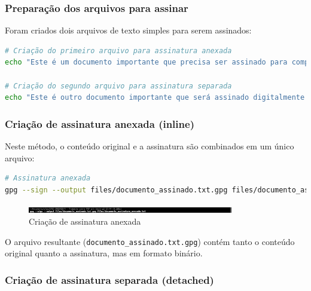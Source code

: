 \subsubsection{Preparação dos arquivos para assinar}

Foram criados dois arquivos de texto simples para serem assinados:

\begin{lstlisting}[language=bash]
# Criação do primeiro arquivo para assinatura anexada
echo "Este é um documento importante que precisa ser assinado para comprovar sua autenticidade. Esta assinatura será anexada ao conteúdo original." > files/documento_assinatura_anexada.txt

# Criação do segundo arquivo para assinatura separada
echo "Este é outro documento importante que será assinado digitalmente. Esta assinatura será mantida em um arquivo separado." > files/documento_assinatura_separada.txt
\end{lstlisting}

\subsubsection{Criação de assinatura anexada (inline)}

Neste método, o conteúdo original e a assinatura são combinados em um único arquivo:

\begin{lstlisting}[language=bash]
# Assinatura anexada
gpg --sign --output files/documento_assinado.txt.gpg files/documento_assinatura_anexada.txt
\end{lstlisting}

\begin{figure}[htb]
    \centering
    \includegraphics[width=0.8\textwidth]{images/11-criacao_assinatura_anexada.jpg}
    \caption{Criação de assinatura anexada}
    \label{fig:criacao-assinatura-anexada}
\end{figure}

O arquivo resultante (\texttt{documento\_assinado.txt.gpg}) contém tanto o conteúdo original quanto a assinatura, mas em formato binário.

\subsubsection{Criação de assinatura separada (detached)}

